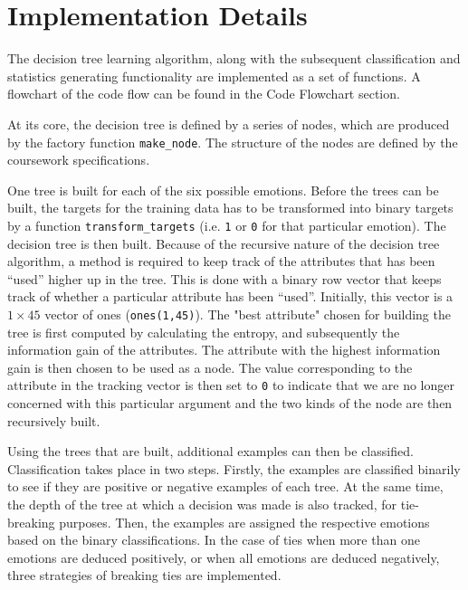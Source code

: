 \documentclass[a4paper]{article}
\begin{document}

\section{Implementation Details}

The decision tree learning algorithm, along with the subsequent classification and statistics generating functionality are implemented as a set of functions. A flowchart of the code flow can be found in the Code Flowchart section.\medskip

At its core, the decision tree is defined by a series of nodes, which are produced by the factory function \texttt{make\_node}. The structure of the nodes are defined by the coursework specifications.\medskip

One tree is built for each of the six possible emotions. Before the trees can be built, the targets for the training data has to be transformed into binary targets by a function \texttt{transform\_targets} (i.e. \texttt{1} or \texttt{0} for that particular emotion). The decision tree is then built. Because of the recursive nature of the decision tree algorithm, a method is required to keep track of the attributes that has been “used” higher up in the tree. This is done with a binary row vector that keeps track of whether a particular attribute has been “used”. Initially, this vector is a $1\times45$ vector of ones (\texttt{ones(1,45)}). The "best attribute" chosen for building the tree is first computed by calculating the entropy, and subsequently the information gain of the attributes. The attribute with the highest information gain is then chosen to be used as a node. The value corresponding to the attribute in the tracking vector is then set to \texttt{0} to indicate that we are no longer concerned with this particular argument and the two kinds of the node are then recursively built.\medskip

Using the trees that are built, additional examples can then be classified. Classification takes place in two steps. Firstly, the examples are classified binarily to see if they are positive or negative examples of each tree. At the same time, the depth of the tree at which a decision was made is also tracked, for tie-breaking purposes. Then, the examples are assigned the respective emotions based on the binary classifications. In the case of ties when more than one emotions are deduced positively, or when all emotions are deduced negatively, three strategies of breaking ties are implemented.\medskip
\end{document}
